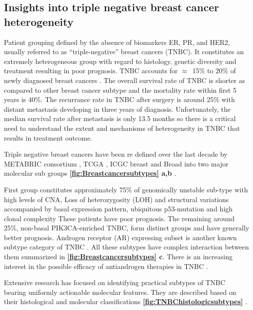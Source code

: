 \subsection{Insights into triple negative breast cancer heterogeneity}
Patient grouping defined by the absence of biomarkers ER, PR, and HER2, usually referred to as “triple-negative” breast cancers (TNBC). It constitutes an extremely heterogeneous group with regard to histology, genetic diversity and treatment resulting in poor prognosis. TNBC accounts for $\approx$~15\% to 20\% of newly diagnosed breast cancers \cite{reis2008triple}.
The overall survival rate of TNBC is shorter as compared to other breast cancer subtype and the mortality rate within first 5 years is 40\%. The recurrance rate in TNBC after surgery is  around 25\% with distant metastasis developing in three years of diagnosis. Unfortunately, the median survival rate after metastasis is only 13.5 months \cite{dent2007triple,lin2008sites} so there is a critical need to understand the extent and mechanisms of heterogeneity in TNBC that results in treatment outcome. 

Triple negative breast cancers have been re defined over the last decade by METABRIC consortium \cite{curtis2012genomic, dvinge2013shaping, pereira2016somatic, dawson2013new, bilal2013improving}, TCGA \cite{weinstein2013cancer}, ICGC breast \cite{international2010international} and Broad \cite{banerji2012sequence, rheinbay2017recurrent} into two major molecular sub groups \textbf{\autoref{fig:Breastcancersubtypes} a,b} \cite{xu2014omics}.

First group constitutes approximately 75\% of genomically unstable sub-type with high levels of \ac{CNA}, Loss of heterozygosity (LOH) and structural variations accompanied by basal expression pattern, ubiquitous p53-mutation and high clonal complexity \cite{shah2012clonal, garrido2019insights} These patients have poor prognosis. The remaining around 25\%,  non-basal PIK3CA-enriched TNBC, form distinct groups and have generally better prognosis. Androgen receptor (AR) expressing subset is another known subtype category of TNBC \cite{tang2012expression, rakha2007prognostic,mrklic2013expression}. All these subtypes have complex interaction between them summarized in \textbf{\autoref{fig:Breastcancersubtypes} c}.
There is an increasing interest in the possible efficacy of antiandrogen therapies in TNBC \cite{gerratana2018androgen,gucalp2013phase}.

 Extensive research has focused on identifying practical subtypes of TNBC bearing uniformly actionable molecular features. They are described based on their histological and molecular classifications \textbf{\autoref{fig:TNBChistologicsubtypes}} \cite{weigelt2009histological,bianchini2016triple}. 

